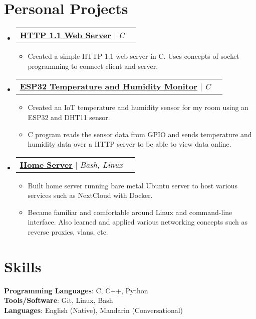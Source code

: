 \documentclass[letterpaper,12pt]{article}
\makeatletter
\newcommand{\resumeItem}[1]{
  \item\small{
    {#1 \vspace{-2pt}}
  }
}
\newcommand{\resumeProjectHeading}[2]{
    \item
    \begin{tabular*}{0.97\textwidth}{l@{\extracolsep{\fill}}r}
      \small#1 & #2 \\
    \end{tabular*}\vspace{-7pt}
}
\newcommand{\resumeSubHeadingListStart}{\begin{itemize}[leftmargin=0.15in, label={}]}
\newcommand{\resumeSubHeadingListEnd}{\end{itemize}}
\newcommand{\resumeItemListStart}{\begin{itemize}}
\newcommand{\resumeItemListEnd}{\end{itemize}\vspace{-5pt}}
\makeatother
\begin{document}
\section{Personal Projects}
    \resumeSubHeadingListStart
      \resumeProjectHeading
      {\textbf{\href{https://github.com/jamesyoung-15/http-server}{\underline {HTTP 1.1 Web Server}}} $|$ \emph{C}}{}
      \resumeItemListStart
        \resumeItem{\normalsize{Created a simple HTTP 1.1 web server in C. Uses concepts of socket programming to connect client and server.}}
      \resumeItemListEnd
      \resumeProjectHeading
      {\textbf{\href{https://github.com/jamesyoung-15/http-server}{\underline {ESP32 Temperature and Humidity Monitor}}} $|$ \emph{C}}{}
      \resumeItemListStart
        \resumeItem{\normalsize{Created an IoT temperature and humidity sensor for my room using an ESP32 and DHT11 sensor.}}
        \resumeItem{\normalsize{C program reads the sensor data from GPIO and sends temperature and humidity data over a HTTP server to be able to view data online.}}
      \resumeItemListEnd
      \resumeProjectHeading
          {\textbf{\href{https://github.com/jamesyoung-15/homeserver}{\underline {Home Server}}} $|$ \emph{Bash, Linux}}{}
          \resumeItemListStart
            \resumeItem{\normalsize{Built home server running bare metal Ubuntu server to host various services such as NextCloud with Docker.}}
            \resumeItem{\normalsize{Became familiar and comfortable around Linux and command-line interface. Also learned and applied various networking concepts such as reverse proxies, vlans, etc.}}
      \resumeItemListEnd

    \resumeSubHeadingListEnd



%
\section{Skills}
 \begin{itemize}[leftmargin=0.15in, label={}]
    \small{\item{
     \textbf{Programming Languages}{: C, C++, Python} \\
     \textbf{Tools/Software}{: Git, Linux, Bash} \\
     \textbf{Languages}{: English (Native), Mandarin (Conversational)} \\
    }}
 \end{itemize}
\end{document}
